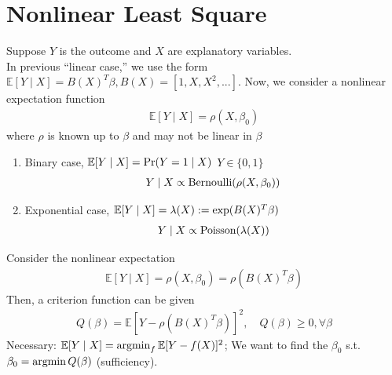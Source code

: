 \documentclass[11pt]{elegantbook}
\newcommand{\argmin}{\operatornamewithlimits{argmin}}
\begin{document}
\section{Nonlinear Least Square}
Suppose $Y$ is the outcome and $X$ are explanatory variables.\\
In previous ``linear case,'' we use the form $\mathbb{E}[Y\mid X]=B(X)^T\beta, B(X)=[1,X,X^2,...]$. Now, we consider a nonlinear expectation function
\begin{equation}
    \begin{aligned}
        \mathbb{E}[Y\mid X]=\rho(X,\beta_0)
    \end{aligned}
    \nonumber
\end{equation}
where $\rho$ is known up to $\beta$ and may not be linear in $\beta$
\begin{example}
    \begin{enumerate}
        \item Binary case, $\mathbb{E}[Y\mid X]=\textnormal{Pr}(Y=1\mid X)$ $Y\in\{0,1\}$
        \begin{equation}
            \begin{aligned}
                Y\mid X\propto \textnormal{Bernoulli}(\rho(X,\beta_0))
            \end{aligned}
            \nonumber
        \end{equation}
        \item Exponential case, $\mathbb{E}[Y\mid X]=\lambda(X):=\textnormal{exp}(B(X)^T\beta)$
        \begin{equation}
            \begin{aligned}
                Y\mid X\propto \textnormal{Poisson}(\lambda(X))
            \end{aligned}
            \nonumber
        \end{equation}
    \end{enumerate}
\end{example}

Consider the nonlinear expectation
\begin{equation}
    \begin{aligned}
        \mathbb{E}[Y\mid X]=\rho(X,\beta_0)=\rho(B(X)^T\beta)
    \end{aligned}
    \nonumber
\end{equation}
Then, a criterion function can be given
\begin{equation}
    \begin{aligned}
        Q(\beta)=\mathbb{E}[Y-\rho(B(X)^T\beta)]^2,\quad Q(\beta)\geq 0,\forall \beta
    \end{aligned}
    \nonumber
\end{equation}
Necessary: $\mathbb{E}[Y\mid X]=\argmin_f \mathbb{E}[Y-f(X)]^2$; We want to find the $\beta_0$ s.t. $\beta_0=\argmin Q(\beta)$ (sufficiency).
\end{document}
